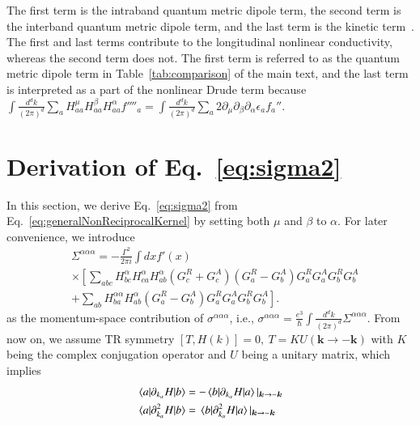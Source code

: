 \documentclass[twocolumn,superscriptaddress]{revtex4-1}
\begin{document}
The first term is the intraband quantum metric dipole term, the second term is the interband quantum metric dipole term, and the last term is the kinetic term~\cite{Ulrich2026,Guo2026}.
The first and last terms contribute to the longitudinal nonlinear conductivity, whereas the second term does not. 
The first term is referred to as the quantum metric dipole term in Table~\ref{tab:comparison} of the main text, and the last term is interpreted as a part of the nonlinear Drude term because $\int \frac{d^d k}{(2\pi)^d}\sum_{a}H_{aa}^\mu H_{aa}^\beta H_{aa}^\alpha f''''_a=\int \frac{d^d k}{(2\pi)^d}\sum_{a}2\partial_\mu \partial_\beta \partial_\alpha \epsilon_a f_a''$.



\section{Derivation of Eq.~\eqref{eq:sigma2}} \label{app:derivationSigma2}
In this section, we derive Eq.~\eqref{eq:sigma2} from Eq.~\eqref{eq:generalNonReciprocalKernel} by setting both $\mu$ and $\beta$ to $\alpha$.
For later convenience, we introduce
\begin{align}
  &\Sigma^{\alpha\alpha\alpha} =-\frac{\Gamma^2 }{2\pi i} \int dx f'(x)\nonumber \\
  &\times \left[\sum_{abc}H_{bc}^\alpha H_{ca}^\alpha H_{ab}^\alpha (G^R_c+G^A_c) \left(G^R_a-G^A_b\right)G^R_a G^A_a G^R_b G^A_b  \right. \nonumber \\
  &\left. +\sum_{ab}H_{ba}^{\alpha\alpha} H_{ab}^\alpha\left(G^R_a-G^A_b\right)G^R_a G^A_a G^R_b G^A_b \right]. \label{eq:longitudinalNonReciprocalKernel}
\end{align}
as the momentum-space contribution of $\sigma^{\alpha\alpha\alpha}$, i.e., $\sigma^{\alpha\alpha\alpha}=\frac{e^3}{\hbar}\int \frac{d^d k}{(2\pi)^d}\Sigma^{\alpha\alpha\alpha}$.
From now on, we assume TR symmetry $[T,H(k)]=0, \ T=KU(\bm{k}\to -\bm{k})$ with $K$ being the complex conjugation operator and $U$ being a unitary matrix, which implies 
\begin{align}
  \mel{a}{\partial_{k_\alpha} H }{b}
  &=-\mel{b}{\partial_{k_\alpha} H }{a}|_{\bm{k}\to -\bm{k}} \\
  \mel{a}{\partial_{k_\alpha}^2 H }{b}&=\mel{b}{\partial_{k_\alpha}^2 H }{a}|_{\bm{k}\to -\bm{k}}
\end{align}
\end{document}
